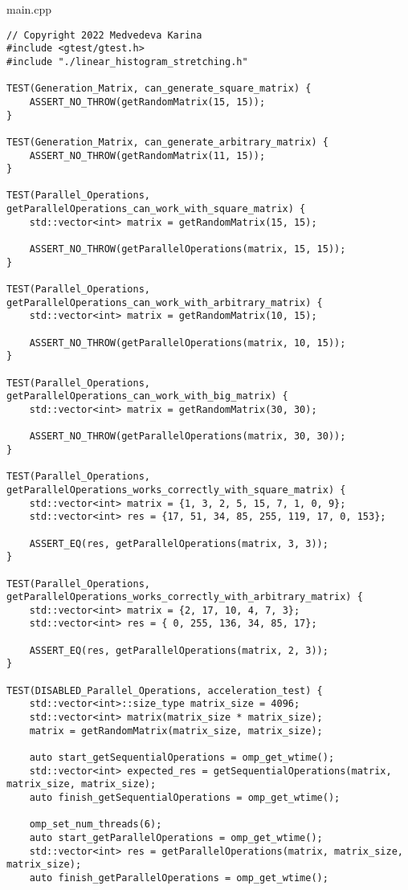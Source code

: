 \documentclass{report}
\begin{document}
\par main.cpp
\begin{lstlisting}
// Copyright 2022 Medvedeva Karina
#include <gtest/gtest.h>
#include "./linear_histogram_stretching.h"

TEST(Generation_Matrix, can_generate_square_matrix) {
    ASSERT_NO_THROW(getRandomMatrix(15, 15));
}

TEST(Generation_Matrix, can_generate_arbitrary_matrix) {
    ASSERT_NO_THROW(getRandomMatrix(11, 15));
}

TEST(Parallel_Operations, getParallelOperations_can_work_with_square_matrix) {
    std::vector<int> matrix = getRandomMatrix(15, 15);

    ASSERT_NO_THROW(getParallelOperations(matrix, 15, 15));
}

TEST(Parallel_Operations, getParallelOperations_can_work_with_arbitrary_matrix) {
    std::vector<int> matrix = getRandomMatrix(10, 15);

    ASSERT_NO_THROW(getParallelOperations(matrix, 10, 15));
}

TEST(Parallel_Operations, getParallelOperations_can_work_with_big_matrix) {
    std::vector<int> matrix = getRandomMatrix(30, 30);

    ASSERT_NO_THROW(getParallelOperations(matrix, 30, 30));
}

TEST(Parallel_Operations, getParallelOperations_works_correctly_with_square_matrix) {
    std::vector<int> matrix = {1, 3, 2, 5, 15, 7, 1, 0, 9};
    std::vector<int> res = {17, 51, 34, 85, 255, 119, 17, 0, 153};

    ASSERT_EQ(res, getParallelOperations(matrix, 3, 3));
}

TEST(Parallel_Operations, getParallelOperations_works_correctly_with_arbitrary_matrix) {
    std::vector<int> matrix = {2, 17, 10, 4, 7, 3};
    std::vector<int> res = { 0, 255, 136, 34, 85, 17};

    ASSERT_EQ(res, getParallelOperations(matrix, 2, 3));
}

TEST(DISABLED_Parallel_Operations, acceleration_test) {
    std::vector<int>::size_type matrix_size = 4096;
    std::vector<int> matrix(matrix_size * matrix_size);
    matrix = getRandomMatrix(matrix_size, matrix_size);

    auto start_getSequentialOperations = omp_get_wtime();
    std::vector<int> expected_res = getSequentialOperations(matrix, matrix_size, matrix_size);
    auto finish_getSequentialOperations = omp_get_wtime();

    omp_set_num_threads(6);
    auto start_getParallelOperations = omp_get_wtime();
    std::vector<int> res = getParallelOperations(matrix, matrix_size, matrix_size);
    auto finish_getParallelOperations = omp_get_wtime();


\end{lstlisting}
\end{document}
